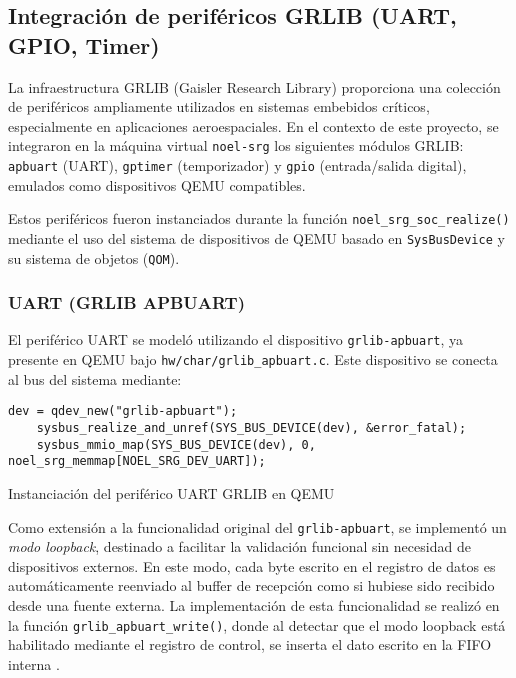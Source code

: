 \subsection{Integración de periféricos GRLIB (UART, GPIO, Timer)}
\label{subsec:grlib-perifericos}

La infraestructura GRLIB (Gaisler Research Library) proporciona una colección de periféricos ampliamente utilizados en sistemas embebidos críticos, especialmente en aplicaciones aeroespaciales. En el contexto de este proyecto, se integraron en la máquina virtual \texttt{noel-srg} los siguientes módulos GRLIB: \texttt{apbuart} (UART), \texttt{gptimer} (temporizador) y \texttt{gpio} (entrada/salida digital), emulados como dispositivos QEMU compatibles.

Estos periféricos fueron instanciados durante la función \texttt{noel\_srg\_soc\_realize()} mediante el uso del sistema de dispositivos de QEMU basado en \texttt{SysBusDevice} y su sistema de objetos (\texttt{QOM}).

\subsubsection*{UART (GRLIB APBUART)}

El periférico UART se modeló utilizando el dispositivo \texttt{grlib-apbuart}, ya presente en QEMU bajo \texttt{hw/char/grlib\_apbuart.c}. Este dispositivo se conecta al bus del sistema mediante:


\begin{codefloat}
\begin{lstlisting}[style=CppExample]
    dev = qdev_new("grlib-apbuart");
    sysbus_realize_and_unref(SYS_BUS_DEVICE(dev), &error_fatal);
    sysbus_mmio_map(SYS_BUS_DEVICE(dev), 0, noel_srg_memmap[NOEL_SRG_DEV_UART]);
\end{lstlisting}
\caption{Instanciación del periférico UART GRLIB en QEMU}
\end{codefloat}


Como extensión a la funcionalidad original del \texttt{grlib-apbuart}, se implementó un \emph{modo loopback}, destinado a facilitar la validación funcional sin necesidad de dispositivos externos. En este modo, cada byte escrito en el registro de datos es automáticamente reenviado al buffer de recepción como si hubiese sido recibido desde una fuente externa. La implementación de esta funcionalidad se realizó en la función \texttt{grlib\_apbuart\_write()}, donde al detectar que el modo loopback está habilitado mediante el registro de control, se inserta el dato escrito en la FIFO interna .

